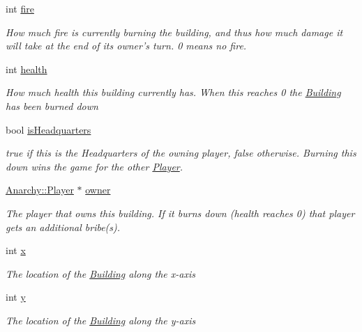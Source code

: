 \begin{DoxyCompactItemize}
int \hyperlink{classAnarchy_1_1Building_a05b636d766c51eba120d9e044d82a402}{fire}
\begin{DoxyCompactList}\small\item\em How much fire is currently burning the building, and thus how much damage it will take at the end of its owner's turn. 0 means no fire. \end{DoxyCompactList}\item 
int \hyperlink{classAnarchy_1_1Building_a3536e925fb8fc11bb403cc0555f935a4}{health}
\begin{DoxyCompactList}\small\item\em How much health this building currently has. When this reaches 0 the \hyperlink{classAnarchy_1_1Building}{Building} has been burned down \end{DoxyCompactList}\item 
bool \hyperlink{classAnarchy_1_1Building_a46e92ca7a40a44b467c58e1c67944d48}{is\-Headquarters}
\begin{DoxyCompactList}\small\item\em true if this is the Headquarters of the owning player, false otherwise. Burning this down wins the game for the other \hyperlink{classAnarchy_1_1Player}{Player}. \end{DoxyCompactList}\item 
\hyperlink{classAnarchy_1_1Player}{Anarchy\-::\-Player} $\ast$ \hyperlink{classAnarchy_1_1Building_ab3e204cfff1707cb86793b7889958e7f}{owner}
\begin{DoxyCompactList}\small\item\em The player that owns this building. If it burns down (health reaches 0) that player gets an additional bribe(s). \end{DoxyCompactList}\item 
int \hyperlink{classAnarchy_1_1Building_a4748629dadd04cc82b3894214c764724}{x}
\begin{DoxyCompactList}\small\item\em The location of the \hyperlink{classAnarchy_1_1Building}{Building} along the x-\/axis \end{DoxyCompactList}\item 
int \hyperlink{classAnarchy_1_1Building_a9f3e61c752dba70cec82fc293444f295}{y}
\begin{DoxyCompactList}\small\item\em The location of the \hyperlink{classAnarchy_1_1Building}{Building} along the y-\/axis \end{DoxyCompactList}\end{DoxyCompactItemize}
